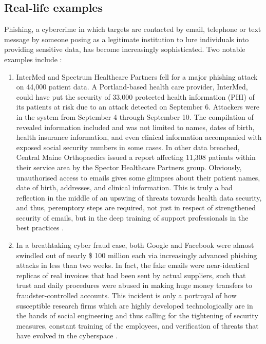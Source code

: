 \subsection{Real-life examples}

Phishing, a cybercrime in which targets are contacted by email, telephone or text message by someone posing as a legitimate institution to lure individuals into providing sensitive data, has become increasingly sophisticated. Two notable examples include :

\begin{enumerate}
    \item InterMed and Spectrum Healthcare Partners fell for a major phishing attack on 44,000 patient data. A Portland-based health care provider, InterMed, could have put the security of 33,000 protected health information (PHI) of its patients at risk due to an attack detected on September 6. Attackers were in the system from September 4 through September 10. The compilation of revealed information included and was not limited to names, dates of birth, health insurance information, and even clinical information accompanied with exposed social security numbers in some cases. In other data breached, Central Maine Orthopaedics issued a report affecting 11,308 patients within their service area by the Spector Healthcare Partners group. Obviously, unauthorised access to emails gives some glimpses about their patient names, date of birth, addresses, and clinical information. This is truly a bad reflection in the middle of an upswing of threats towards health data security, and thus, peremptory steps are required, not just in respect of strengthened security of emails, but in the deep training of support professionals in the best practices \cite{HIPAAJournal2020Phishing} .
    \item In a breathtaking cyber fraud case, both Google and Facebook were almost swindled out of nearly \$ 100 million each via increasingly advanced phishing attacks in less than two weeks. In fact, the fake emails were near-identical replicas of real invoices that had been sent by actual suppliers, such that trust and daily procedures were abused in making huge money transfers to fraudster-controlled accounts. This incident is only a portrayal of how susceptible research firms which are highly developed technologically are in the hands of social engineering and thus calling for the tightening of security measures, constant training of the employees, and verification of threats that have evolved in the cyberspace \cite{CNBC2019Phishing}.
\end{enumerate}

